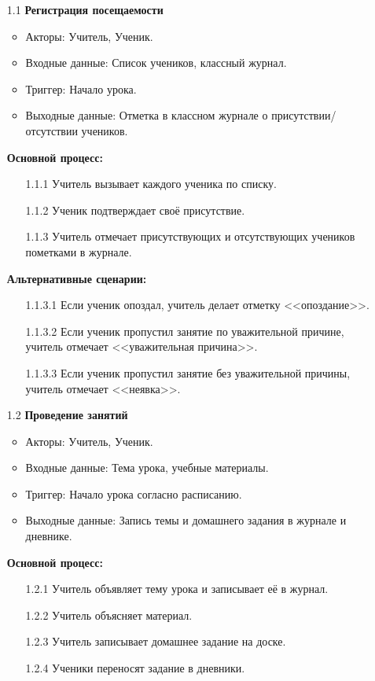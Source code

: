 \documentclass[a4paper, final]{article}
\begin{document}
\begin{enumerate}
  \item[1.1] \textbf{Регистрация посещаемости}
  \begin{itemize}
    \item Акторы: Учитель, Ученик.
    \item Входные данные: Список учеников, классный журнал.
    \item Триггер: Начало урока.
    \item Выходные данные: Отметка в классном журнале о присутствии/отсутствии учеников.
  \end{itemize}

  \textbf{Основной процесс:}
  \begin{enumerate}
    \item[1.1.1] Учитель вызывает каждого ученика по списку.
    \item[1.1.2] Ученик подтверждает своё присутствие.
    \item[1.1.3] Учитель отмечает присутствующих и отсутствующих учеников пометками в журнале.
  \end{enumerate}
  
  \textbf{Альтернативные сценарии:}
  \begin{itemize}
    \item[1.1.3.1] Если ученик опоздал, учитель делает отметку <<опоздание>>.
    \item[1.1.3.2] Если ученик пропустил занятие по уважительной причине, учитель отмечает <<уважительная причина>>.
    \item[1.1.3.3] Если ученик пропустил занятие без уважительной причины, учитель отмечает <<неявка>>.
  \end{itemize}
 
  \item[1.2] \textbf{Проведение занятий}
  \begin{itemize}
    \item Акторы: Учитель, Ученик.
    \item Входные данные: Тема урока, учебные материалы.
    \item Триггер: Начало урока согласно расписанию.
    \item Выходные данные: Запись темы и домашнего задания в журнале и дневнике.
  \end{itemize}

  \textbf{Основной процесс:}
  \begin{enumerate}
    \item[1.2.1] Учитель объявляет тему урока и записывает её в журнал.
    \item[1.2.2] Учитель объясняет материал.
    \item[1.2.3] Учитель записывает домашнее задание на доске.
    \item[1.2.4] Ученики переносят задание в дневники.
  \end{enumerate}


\end{enumerate}
\end{document}
